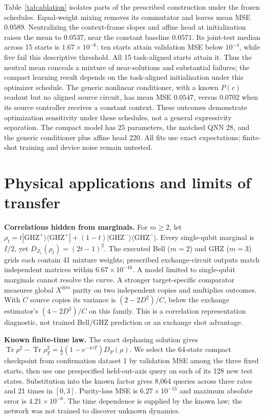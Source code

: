 \documentclass[pdflatex,sn-mathphys-num]{sn-jnl}
\newcommand{\Tr}{\operatorname{Tr}}
\begin{document}
Table~\ref{tab:ablation} isolates parts of the prescribed construction under the frozen schedules. Equal-weight mixing removes its commutator and leaves mean MSE $0.0589$. Neutralizing the context-frame slopes and affine head at initialization raises the mean to $0.0537$, near the constant baseline $0.0571$. Its joint-test median across 15 starts is $1.67\times10^{-6}$: ten starts attain validation MSE below $10^{-4}$, while five fail this descriptive threshold. All 15 task-aligned starts attain it. Thus the neutral mean conceals a mixture of near-solutions and substantial failures; the compact learning result depends on the task-aligned initialization under this optimizer schedule. The generic nonlinear conditioner, with a known $P(c)$ readout but no aligned source circuit, has mean MSE $0.0547$, versus $0.0702$ when its source controller receives a constant context. These outcomes demonstrate optimization sensitivity under these schedules, not a general expressivity separation. The compact model has 25 parameters, the matched QNN 28, and the generic conditioner plus affine head 220. All fits use exact expectations; finite-shot training and device noise remain untested.

\section{Physical applications and limits of transfer}
\textbf{Correlations hidden from marginals.} For $m\ge2$, let $\rho_t=t|\mathrm{GHZ}^+\rangle\langle\mathrm{GHZ}^+|+(1-t)|\mathrm{GHZ}^-\rangle\langle\mathrm{GHZ}^-|$. Every single-qubit marginal is $I/2$, yet $D_{Z_1}(\rho_t)=(2t-1)^2$. The executed Bell ($m=2$) and GHZ ($m=3$) grids each contain 41 mixture weights; prescribed exchange-circuit outputs match independent matrices within $6.67\times10^{-16}$. A model limited to single-qubit marginals cannot resolve the curve. A stronger target-specific comparator measures global $X^{\otimes m}$ parity on two independent copies and multiplies outcomes. With $C$ source copies its variance is $(2-2D^2)/C$, below the exchange estimator's $(4-2D^2)/C$ on this family. This is a correlation representation diagnostic, not trained Bell/GHZ prediction or an exchange shot advantage.

\textbf{Known finite-time law.} The exact dephasing solution gives $\Tr\rho^2-\Tr\rho_T^2=\frac12(1-e^{-4\gamma T})D_P(\rho)$. We select the 64-state compact checkpoint from confirmation dataset 1 by validation MSE among the three fixed starts, then use one prespecified held-out-axis query on each of its 128 new test states. Substitution into the known factor gives 8,064 queries across three rates and 21 times in $[0,3]$. Purity-loss MSE is $6.27\times10^{-13}$ and maximum absolute error is $4.21\times10^{-6}$. The time dependence is supplied by the known law; the network was not trained to discover unknown dynamics.
\end{document}
